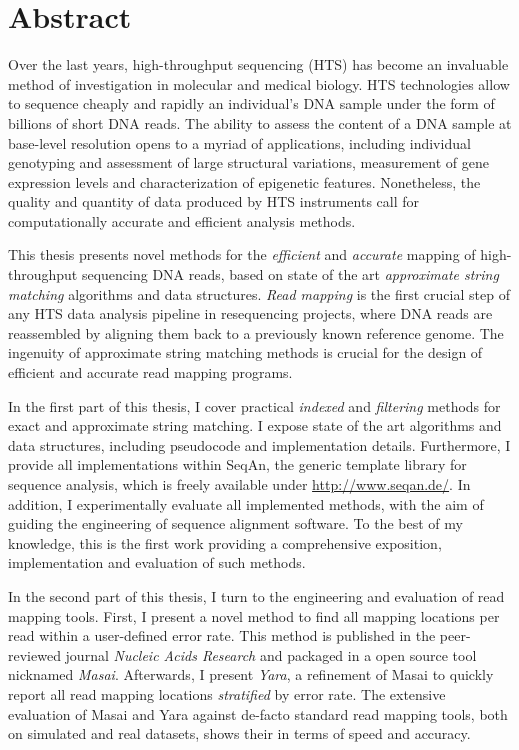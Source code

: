 \section*{Abstract}
\label{sec:abstract:en}

Over the last years, high-throughput sequencing (HTS) has become an invaluable method of investigation in molecular  and medical biology.
HTS technologies allow to sequence cheaply and rapidly an individual's DNA sample under the form of billions of short DNA reads.
The ability to assess the content of a DNA sample at base-level resolution opens to a myriad of applications, including individual genotyping and assessment of large structural variations, measurement of gene expression levels and characterization of epigenetic features.
Nonetheless, the quality and quantity of data produced by HTS instruments call for computationally accurate and efficient analysis methods.

This thesis presents novel methods for the \emph{efficient} and \emph{accurate} mapping of high-throughput sequencing DNA reads, based on state of the art \emph{approximate string matching} algorithms and data structures.
\emph{Read mapping} is the first crucial step of any HTS data analysis pipeline in resequencing projects, where DNA reads are reassembled by aligning them back to a previously known reference genome.
The ingenuity of approximate string matching methods is crucial for the design of efficient and accurate read mapping programs.

In the first part of this thesis, I cover practical \emph{indexed} and \emph{filtering} methods for exact and approximate string matching.
I expose state of the art algorithms and data structures, including pseudocode and implementation details.
Furthermore, I provide all implementations within SeqAn, the generic \CC template library for sequence analysis, which is freely available under \url{http://www.seqan.de/}.
In addition, I experimentally evaluate all implemented methods, with the aim of guiding the engineering of sequence alignment software.
To the best of my knowledge, this is the first work providing a comprehensive exposition, implementation and evaluation of such methods.

In the second part of this thesis, I turn to the engineering and evaluation of read mapping tools.
First, I present a novel method to find all mapping locations per read within a user-defined error rate.
This method is published in the peer-reviewed journal \emph{Nucleic Acids Research} and packaged in a open source tool nicknamed \emph{Masai}.
Afterwards, I present \emph{Yara}, a refinement of Masai to quickly report all read mapping locations \emph{stratified} by error rate.
The extensive evaluation of Masai and Yara against de-facto standard read mapping tools, both on simulated and real datasets, shows their in terms of speed and accuracy.

\newpage
